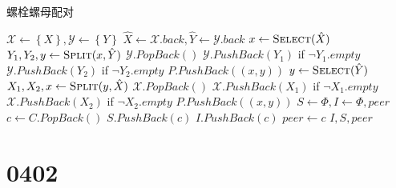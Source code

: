 \documentclass[answers]{exam}
\begin{document}
\begin{questions}
    \begin{algorithm}[H]
        \caption{螺栓螺母配对}\label{0330:Pairwise}
        \begin{algorithmic}[1]
            \State $\mathcal{X} \gets \left\{X\right\}, \mathcal{Y} \gets \left\{ Y \right\}$ 
            \Repeat
            \State $\hat{X} \gets \mathcal{X}.back, \hat{Y} \gets \mathcal{Y}.back$ 
            \State $x \gets \Call{Select}{\hat{X}}$ 
            \State $Y_1, Y_2, y \gets \Call{Split}{x, \hat{Y}}$ 
            \State $\mathcal{Y}.PopBack()$
            \State $\mathcal{Y}.PushBack(Y_1)$ if $\neg Y_1.empty$ 
            \State $\mathcal{Y}.PushBack(Y_2)$ if $\neg Y_2.empty$ 
            \State $P.PushBack((x,y))$ 
            \Else
            \State $y \gets \Call{Select}{\hat{Y}}$ 
            \State $X_1, X_2, x \gets \Call{Split}{y, \hat{X}}$
            \State $\mathcal{X}.PopBack()$
            \State $\mathcal{X}.PushBack(X_1)$ if $\neg X_1.empty$
            \State $\mathcal{X}.PushBack(X_2)$ if $\neg X_2.empty$
            \State $P.PushBack((x,y))$
            \EndIf
             
            \Statex
            \State $S \gets \Phi, I \gets \Phi, peer$
            \State $c \gets C.PopBack()$
            \State $S.PushBack(c)$
            \State $I.PushBack(c)$
            \Else
            \State $peer \gets c$
            \EndIf
            \EndWhile
            \State \Return $I, S, peer$
            \EndProcedure
        \end{algorithmic}
    \end{algorithm}

    \newpage %

    \section{0402}\label{sec:0402}


\end{questions}
\end{document}
